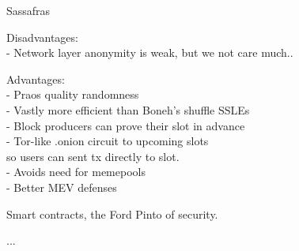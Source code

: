 \documentclass{beamer}
\begin{document}
\begin{frame}{Sassafras}

Disadvantages: \\
- Network layer anonymity is weak, but we not care much.. \\

\bigskip\bigskip

Advantages: \\ \smallskip
- Praos quality randomness \\ \smallskip
- Vastly more efficient than Boneh's shuffle SSLEs \\ \smallskip
- Block producers can prove their slot in advance \\ \smallskip
- Tor-like {.onion} circuit to upcoming slots \\
  \hspace{5pt} so users can sent tx directly to slot. \\ \smallskip
- Avoids need for memepools \\ \smallskip
- Better MEV defenses \\ \smallskip

\pause\bigskip\bigskip

\hspace{10pt} Smart contracts, the Ford Pinto of security.

\end{frame}



\begin{frame}
	
...	
	
\end{frame}
\end{document}
